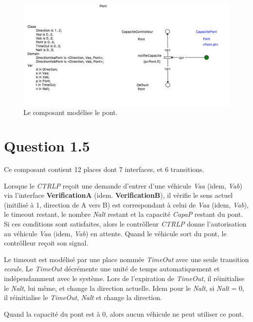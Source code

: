 \documentclass[a4paper,11pt]{report}
\begin{document}
	\begin{figure}[!htbp]
		\centering
		\includegraphics[width = 15cm]{pontModel.png}
		\caption{Le composant modélise le pont.}
	\end{figure}
	\newpage
	
\section{Question 1.5}
	Ce composant contient 12 places dont 7 interfaces, et 6 transitions.
	
	Lorsque le \textit{CTRLP} reçoit une demande d'entrer d'une véhicule \textit{Vaa} (idem, \textit{Vab}) via l'interface \textbf{VerificationA} (idem. \textbf{VerificationB}), il vérifie le sens actuel (initilisé à 1, direction de A vers B) est correspondant à celui de \textit{Vaa} (idem, \textit{Vab}), le timeout restant, le nombre \textit{Nalt} restant et la capacité \textit{CapaP} restant du pont. Si ces conditions sont satisfaites, alors le contrôlleur \textit{CTRLP} donne l'autorisation au véhicule \textit{Vaa} (idem, \textit{Vab}) en attente. Quand le véhicule sort du pont, le contrôlleur reçoit son signal. 
	
	Le timeout est modélisé par une place nommée \textit{TimeOut} avec une seule transition \textit{ecoule}. Le \textit{TimeOut} décrémente une unité de temps automatiquement et indépendamment avec le système. Lors de l'expiration de \textit{TimeOut}, il réinitialise le \textit{Nalt}, lui même, et change la direction actuelle.  Idem pour le \textit{Nalt}, si \textit{Nalt} = 0, il réinitialise le \textit{TimeOut}, \textit{Nalt} et change la direction.
	
	Quand la capacité du pont est à 0, alors aucun véhicule ne peut utiliser ce pont.
\end{document}
